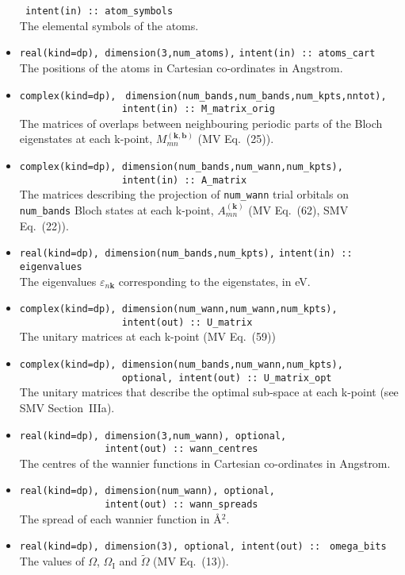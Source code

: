 \begin{itemize}
      \verb# intent(in) :: atom_symbols#\\ The elemental symbols of
      the atoms.
\item \verb#real(kind=dp), dimension(3,num_atoms),#
      \verb#intent(in) :: atoms_cart#\\ The positions of the atoms in
      Cartesian co-ordinates in Angstrom.
\item \verb#complex(kind=dp),#
      \verb# dimension(num_bands,num_bands,num_kpts,nntot),#\\
      \verb#                  intent(in) :: M_matrix_orig#\\ 
      The matrices of overlaps between neighbouring periodic parts of
      the Bloch eigenstates at each k-point, $M_{mn}^{(\mathbf{k,b})}$
      (MV Eq.~(25)).
\item \verb#complex(kind=dp), dimension(num_bands,num_wann,num_kpts),#\\
      \verb#                  intent(in) :: A_matrix# \\The matrices
      describing the projection of \verb#num_wann# trial orbitals on
      \verb#num_bands# Bloch states at each k-point,
      $A_{mn}^{(\mathbf{k})}$ (MV Eq.~(62), SMV Eq.~(22)).
\item \verb#real(kind=dp), dimension(num_bands,num_kpts),#
      \verb#intent(in) :: eigenvalues#\\ The
      eigenvalues $\varepsilon_{n\mathbf{k}}$ corresponding to the
      eigenstates, in eV.
\item \verb#complex(kind=dp), dimension(num_wann,num_wann,num_kpts),#\\
      \verb#                  intent(out) :: U_matrix#\\ The unitary
      matrices at each k-point (MV Eq.~(59))
\item \verb#complex(kind=dp), dimension(num_bands,num_wann,num_kpts),#\\
      \verb#                  optional, intent(out) :: U_matrix_opt#\\ The
      unitary matrices that describe the optimal sub-space at each
      k-point (see SMV Section~{\sc IIIa}).
\item \verb#real(kind=dp), dimension(3,num_wann), optional,#\\
      \verb#               intent(out) :: wann_centres#\\ 
      The centres of the wannier
      functions in Cartesian co-ordinates in Angstrom. 
\item \verb#real(kind=dp), dimension(num_wann), optional,#\\
      \verb#               intent(out) :: wann_spreads#\\ 
      The spread of each wannier function in \AA$^{2}$.
\item \verb#real(kind=dp), dimension(3), optional, intent(out) ::#
      \verb# omega_bits#\\ 
      The values of $\Omega$, $\Omega_{\mathrm{I}}$ and
      $\tilde{\Omega}$ (MV Eq.~(13)). 
\end{itemize}

